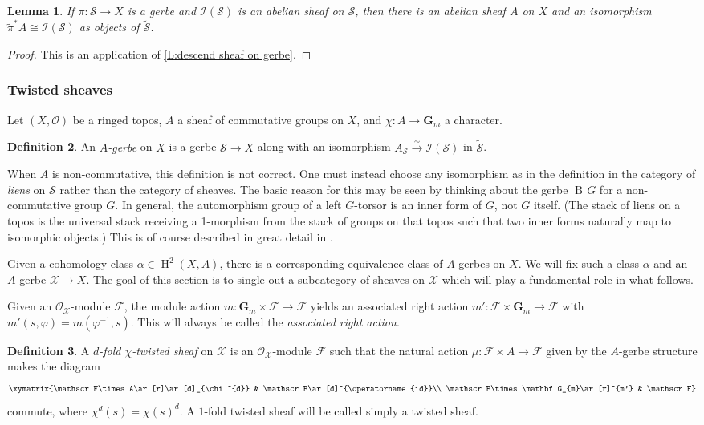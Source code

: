 \documentclass[11pt]{amsart}
\newcommand{\field}[1]{\mathbf #1}
\newcommand{\ms}[1]{\mathscr #1}
\newcommand{\simto}{\stackrel{\sim}{\to}}
\renewcommand{\phi}{\varphi}
\newcommand{\G}{\field G} %
\renewcommand{\H}{\operatorname{H}}
\renewcommand{\[}{[\!\hspace{0.03em}[}
\renewcommand{\]}{]\!\hspace{0.03em}]}
\renewcommand{\(}{(\!\hspace{0.03em}(}
\renewcommand{\)}{)\!\hspace{0.03em})}
\newcommand{\id}{\operatorname{id}}
\DeclareMathOperator{\B}{\operatorname{B\!}}
\newtheorem{lem}{Lemma}[subsubsection]%
\theoremstyle{definition}
\newtheorem{defn}[lem]{Definition}
\theoremstyle{remark}
\begin{document}
\begin{lem} If $\pi:\ms S\to X$ is a gerbe and $\ms I(\ms S)$ is an abelian 
sheaf on $\ms S$, then there is an abelian sheaf $A$ on $X$ and an 
isomorphism $\widetilde{\pi}^{\ast}A\cong\ms I(\ms S)$ as objects 
of $\widetilde{\ms S}$.
\end{lem}
\begin{proof} This is an application of \ref{L:descend sheaf on gerbe}.
\end{proof}

\subsubsection{Twisted sheaves}\label{S:twisted sheaves}

Let $(X,{\ms O})$ be a ringed topos, $A$ a sheaf of commutative groups on 
$X$, and $\chi:A\to\G_{m}$ a character.

\begin{defn} An \emph{$A$-gerbe\/} on $X$ is a gerbe $\ms S\to X$ 
along with an isomorphism $A_{\ms S}\simto\ms I(\ms S)$ in 
$\widetilde{\ms S}$.
\end{defn}
When $A$ is non-commutative, this definition is not correct.  One must 
instead choose any isomorphism as in the definition in the category of 
\emph{liens\/} on $\ms S$ rather than the category of sheaves.  The basic 
reason for this may be seen by thinking about the gerbe $\B{G}$ for a 
non-commutative group $G$.  In general, the automorphism group of a 
left $G$-torsor is an inner form of $G$, not $G$ itself.  (The 
stack of liens on a topos is the universal stack receiving a 1-morphism from 
the stack of groups on that topos such that two inner forms naturally 
map to isomorphic objects.)  This is of course described in great 
detail in \cite{giraud}.

Given a cohomology class 
$\alpha\in\H^{2}(X,A)$, there is a corresponding equivalence class of 
$A$-gerbes on $X$.  We will fix such a class $\alpha$ and an 
$A$-gerbe $\ms X\to X$.  The goal of this section is 
to single out a subcategory of sheaves on $\ms X$ which will play a 
fundamental role in what follows.

Given an ${\ms O}_{\ms X}$-module $\ms F$,
the module action $m:\G_{m}\times\ms F\to\ms F$ yields an 
associated right action $m':\ms F\times\G_{m}\to\ms F$ with 
$m'(s,\phi)=m(\phi^{-1},s)$.  This will always be called the 
\emph{associated right action\/}.

\begin{defn} A \emph{$d$-fold $\chi$-twisted sheaf\/} on $\ms X$ is an ${\ms O}_{\ms 
X}$-module $\ms F$ such that the natural action $\mu:\ms F\times A\to\ms 
F$ given by the $A$-gerbe structure makes the diagram
$$\xymatrix{\ms F\times A\ar[r]\ar[d]_{\chi^{d}} & \ms F\ar[d]^{\id}\\
\ms F\times\G_{m}\ar[r]^{m'} & \ms F}$$
commute, where $\chi^{d}(s)=\chi(s)^{d}$.  A $1$-fold twisted sheaf 
will be called simply a twisted sheaf.
\end{defn}
\end{document}
